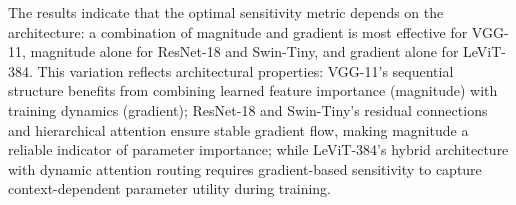\documentclass[11pt, conference]{IEEEtran}
\begin{document}
The results indicate that the optimal sensitivity metric depends on the architecture: a combination of magnitude and gradient is most effective for VGG-11, magnitude alone for ResNet-18 and Swin-Tiny, and gradient alone for LeViT-384. This variation reflects architectural properties: VGG-11's sequential structure benefits from combining learned feature importance (magnitude) with training dynamics (gradient); ResNet-18 and Swin-Tiny's residual connections and hierarchical attention ensure stable gradient flow, making magnitude a reliable indicator of parameter importance; while LeViT-384's hybrid architecture with dynamic attention routing requires gradient-based sensitivity to capture context-dependent parameter utility during training.






\end{document}
